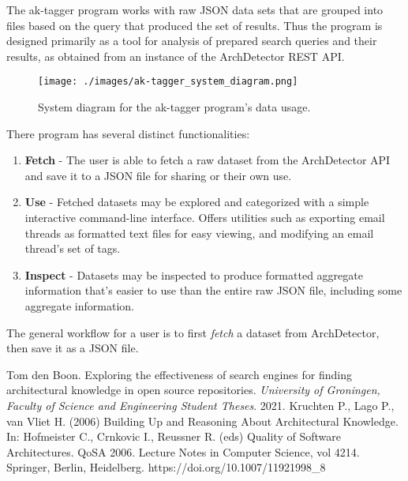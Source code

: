 \documentclass{article}
\begin{document}
		The ak-tagger program works with raw JSON data sets that are grouped into files based on the query that produced the set of results. Thus the program is designed primarily as a tool for analysis of prepared search queries and their results, as obtained from an instance of the ArchDetector REST API.
		
		\begin{figure}
			\texttt{[image: ./images/ak-tagger\_system\_diagram.png]}
			\caption{System diagram for the ak-tagger program's data usage.}
		\end{figure}
		
		There program has several distinct functionalities:
		\begin{enumerate}
			\item \textbf{Fetch} - The user is able to fetch a raw dataset from the ArchDetector API and save it to a JSON file for sharing or their own use.
			\item \textbf{Use} - Fetched datasets may be explored and categorized with a simple interactive command-line interface. Offers utilities such as exporting email threads as formatted text files for easy viewing, and modifying an email thread's set of tags.
			\item \textbf{Inspect} - Datasets may be inspected to produce formatted aggregate information that's easier to use than the entire raw JSON file, including some aggregate information.
		\end{enumerate}
	
		The general workflow for a user is to first \textit{fetch} a dataset from ArchDetector, then save it as a JSON file.
		


\begin{thebibliography}{99}
		Tom den Boon.
		Exploring the effectiveness of search engines for finding architectural knowledge in open source repositories.
		\textit{University of Groningen, Faculty of Science and Engineering Student Theses}.
		2021.
		Kruchten P., Lago P., van Vliet H. (2006) Building Up and Reasoning About Architectural Knowledge. In: Hofmeister C., Crnkovic I., Reussner R. (eds) Quality of Software Architectures. QoSA 2006. Lecture Notes in Computer Science, vol 4214. Springer, Berlin, Heidelberg. https://doi.org/10.1007/11921998\_8
\end{thebibliography}
\end{document}
